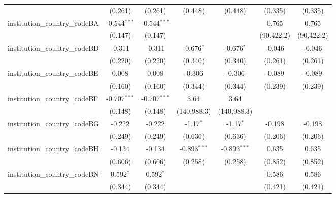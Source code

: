 \begin{tabular}{lcccccc}
                                         & (0.261)        & (0.261)        & (0.448)        & (0.448)        & (0.335)        & (0.335)\\   
   institution\_country\_codeBA          & -0.544$^{***}$ & -0.544$^{***}$ &                &                & 0.765          & 0.765\\   
                                         & (0.147)        & (0.147)        &                &                & (90,422.2)     & (90,422.2)\\   
   institution\_country\_codeBD          & -0.311         & -0.311         & -0.676$^{*}$   & -0.676$^{*}$   & -0.046         & -0.046\\   
                                         & (0.220)        & (0.220)        & (0.340)        & (0.340)        & (0.261)        & (0.261)\\   
   institution\_country\_codeBE          & 0.008          & 0.008          & -0.306         & -0.306         & -0.089         & -0.089\\   
                                         & (0.160)        & (0.160)        & (0.344)        & (0.344)        & (0.239)        & (0.239)\\   
   institution\_country\_codeBF          & -0.707$^{***}$ & -0.707$^{***}$ & 3.64           & 3.64           &                &   \\   
                                         & (0.148)        & (0.148)        & (140,988.3)    & (140,988.3)    &                &   \\   
   institution\_country\_codeBG          & -0.222         & -0.222         & -1.17$^{*}$    & -1.17$^{*}$    & -0.198         & -0.198\\   
                                         & (0.249)        & (0.249)        & (0.636)        & (0.636)        & (0.206)        & (0.206)\\   
   institution\_country\_codeBH          & -0.134         & -0.134         & -0.893$^{***}$ & -0.893$^{***}$ & 0.635          & 0.635\\   
                                         & (0.606)        & (0.606)        & (0.258)        & (0.258)        & (0.852)        & (0.852)\\   
   institution\_country\_codeBN          & 0.592$^{*}$    & 0.592$^{*}$    &                &                & 0.586          & 0.586\\   
                                         & (0.344)        & (0.344)        &                &                & (0.421)        & (0.421)\\   

\end{tabular}
